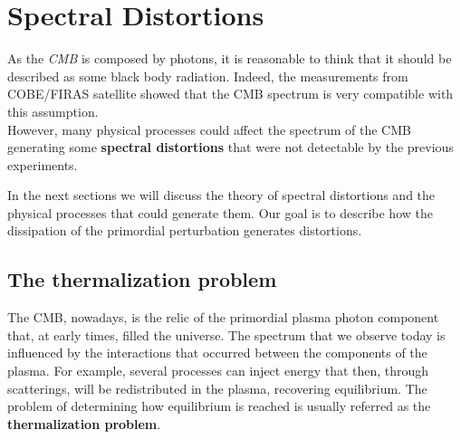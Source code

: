 \chapter{Spectral Distortions}
\label{chap:SpectralDistortions}
As the \emph{CMB} is composed by photons, it is reasonable to think that it should be described as some black body radiation. Indeed, the measurements from COBE/FIRAS satellite \cite{COBE1996} showed that the CMB spectrum is very compatible with this assumption.\\
However, many physical processes could affect the spectrum of the CMB generating some \textbf{spectral distortions} that were not detectable by the previous experiments.

In the next sections we will discuss the theory of spectral distortions and the physical processes that could generate them. Our goal is to describe how the dissipation of the primordial perturbation generates distortions. 
\section{The thermalization problem}\label{sec:ThermalizationProblem}
The CMB, nowadays, is the relic of the primordial plasma photon component that, at early times, filled the universe. The spectrum that we observe today is influenced by the interactions that occurred between the components of the plasma. For example, several processes can inject energy that then, through scatterings, will be redistributed in the plasma, recovering equilibrium. The problem of determining how equilibrium is reached is usually referred as the \textbf{thermalization problem}. 

